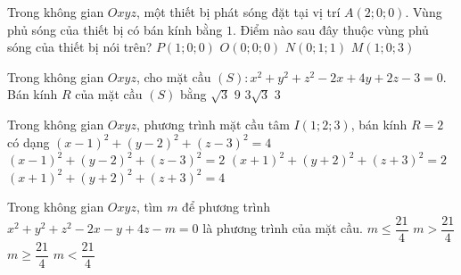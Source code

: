 \begin{ex}%
	Trong không gian $Oxyz$, một thiết bị phát sóng đặt tại vị trí $A(2;0;0)$. Vùng phủ sóng của thiết bị có bán kính bằng $1$. Điểm nào sau đây thuộc vùng phủ sóng của thiết bị nói trên?
	\choice
	{\True $P\left(1;0;0\right)$}
	{$O\left(0;0;0\right)$}
	{$N\left(0;1;1\right)$}
	{$M\left(1;0;3\right)$}
\end{ex}

\begin{ex}%
	Trong không gian $Oxyz$, cho mặt cầu $(S)\colon x^2+y^2+z^2-2x+4y+2z-3=0$. Bán kính $R$ của mặt cầu $(S)$ bằng
	\choice
	{$\sqrt{3}$}
	{$9$}
	{$3\sqrt{3}$}
	{\True $3$}
\end{ex}

\begin{ex}%
	Trong không gian $Oxyz$, phương trình mặt cầu tâm $I\left(1;2;3\right)$, bán kính $R=2$ có dạng
	\choice
	{\True $\left(x-1\right)^2+\left(y-2\right)^2+\left(z-3\right)^2=4$}
	{$\left(x-1\right)^2+\left(y-2\right)^2+\left(z-3\right)^2=2$}
	{$\left(x+1\right)^2+\left(y+2\right)^2+\left(z+3\right)^2=2$}
	{$\left(x+1\right)^2+\left(y+2\right)^2+\left(z+3\right)^2=4$}
\end{ex}

\begin{ex}%
	Trong không gian $Oxyz$, tìm $m$ để phương trình $x^2+y^2+z^2-2x-y+4z-m=0$ là phương trình của mặt cầu.
	\choice
	{$m\le \dfrac{21}{4}$}
	{\True $m > \dfrac{21}{4}$}
	{$m\ge \dfrac{21}{4}$}
	{$m < \dfrac{21}{4}$}
\end{ex}

